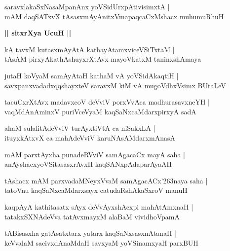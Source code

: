 \documentclass[twoside,12pt,openright]{book}
\def\S{\char'263}
\newcounter{shloka}[chapter]
\def\uvaca#1{\centerline{{\large\textbf{#1}}}}
\begin{document}
\begin{shloka}%
saravxlakaSxNasaMpanAnx yoVSidUrxpAtivisimxtA |\\
mAM daqSATxvX tAsasxmAyAnitxVmapaqcaCxMshacx muhumuRhuH 
\end{shloka}

\uvaca{|| sitxrXya UcuH ||}

\begin{shloka}%
kA tavxM kutasxmAyAtA kathayAtamxviceVSiTxtaM |\\
tAsAM pirxyAkathAshuyxrXtAvx mayoVkatxM taninxshAmaya
\end{shloka}

\begin{shloka}%
jutaH koVyaM samAyAtaH kathaM vA yoVSidAkaqtiH |\\
savxpanxvadadxqqshayxteV saravxM kiM vA mugoVdhxVsimx BUtaLeV
\end{shloka}

\begin{shloka}%
tacuCxrXtAvx madavxcoV deVviV porxVvAca madhurasavxneYH |\\
vaqMdAnAminxV puriVceVyaM kaqSaNxcaMdarxpirxyA sadA 
\end{shloka}

\begin{shloka}%
ahaM sulalitAdeVviV turAyxtiVtA ca niSakxLA |\\
ituyxkAtxvX ca mahAdeVviV karuNAsAMdarxmAnasA 
\end{shloka}

\begin{shloka}%
mAM parxtAyxha punadeRVviV samAgacaCx mayA saha |\\
anAyshacxyoVSitasasxrAvxH kaqSANxpAdaparAyaAH 
\end{shloka}

\begin{shloka}%
tAshacx mAM  parxvadaMNeyxVvaM samAgacACx\S naya saha |\\
tatoVnu kaqSaNxcaMdarxsayx catudaRshAkaSxroV manuH
\end{shloka}

\begin{shloka}%
kaqpAyA kathitasatx sAyx deVvAyxshAcxpi mahAtAmxnaH |\\
tatakxSXNAdeVva tatAvxmayxM alaBaM vividhoVpamA 
\end{shloka}

\begin{shloka}%
tABisasxha gatAsatxtarx yatarx kaqSaNxsasxnAtanaH |\\
keVvalaM  sacivxdAnaMdaH savxyaM yoVSinamxyaH  parxBUH 
\end{shloka}
\end{document}
